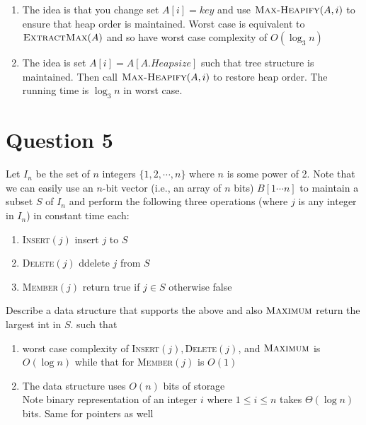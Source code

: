 \documentclass[11pt]{article}
\begin{document}
\begin{enumerate}
\begin{enumerate}
    \item The idea is that you change set $A[i] = key$ and use $\textsc{Max-Heapify}(A, i)$ to ensure that heap order is maintained. Worst case is equivalent to $\textsc{ExtractMax}(A)$ and so have worst case complexity of $O(\log_3 n)$

    \item
    The idea is set $A[i] = A[A.Heapsize]$ such that tree structure is maintained. Then call $\textsc{Max-Heapify}(A,i)$ to restore heap order. The running time is $\log_3 n$ in worst case.
  \end{enumerate}


\section*{Question 5}
Let $I_n$ be the set of $n$ integers $\{ 1,2,\cdots,n \}$ where $n$ is some power of 2.
Note that we can easily use an $n$-bit vector (i.e., an array of $n$ bits) $B[1\cdots n]$ to maintain a subset $S$ of $I_n$ and perform the following three operations (where $j$ is any integer in $I_n$) in constant time each:
\begin{enumerate}
  \item \textsc{Insert}$(j)$ insert $j$ to $S$
  \item \textsc{Delete}$(j)$ ddelete $j$ from $S$
  \item \textsc{Member}$(j)$ return true if $j\in S$ otherwise false
\end{enumerate}
Describe a data structure that supports the above and also $\textsc{Maximum}$ return the largest int in $S$.
such that
\begin{enumerate}
  \item worst case complexity of \textsc{Insert}$(j), $\textsc{Delete}$(j)$, and $\textsc{Maximum}$ is $O(\log n)$ while that for \textsc{Member}$(j)$ is $O(1)$
  \item The data structure uses $O(n)$ bits of storage\\
  Note binary representation of an integer $i$ where $1\leq i \leq n$ takes $\Theta(\log n)$ bits. Same for pointers as well
\end{enumerate}


\end{enumerate}
\end{document}
